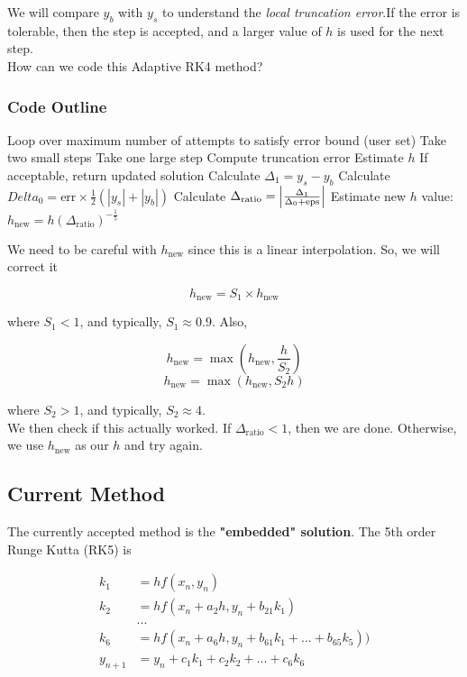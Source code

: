 \documentclass[]{article}
\begin{document}
We will compare $y_b$ with $y_s$ to understand the \textit{local truncation error}.If the error is tolerable, then the step is accepted, and a larger value of $h$ is used for the next step.\\

How can we code this Adaptive RK4 method?

\subsubsection{Code Outline}

\begin{outline}
	\1 Loop over maximum number of attempts to satisfy error bound (user set)
		\2 Take two small steps
		\2 Take one large step
		\2 Compute truncation error
		\2 Estimate $h$
		\2 If acceptable, return updated solution
	\1 Calculate $\Delta_1 = y_s - y_b$
	\1 Calculate $Delta_0 = \text{err} \times \frac{1}{2}(|y_s| + |y_b|)$
	\1 Calculate $\Delta_{\text{ratio}} = \abs{\frac{\Delta_1}{\Delta_0 + \text{eps}}}$
	\1 Estimate new $h$ value: $h_{\text{new}} = h(\Delta_{\text{ratio}})^{-\frac{1}{5}}$
\end{outline}

We need to be careful with $h_{\text{new}}$ since this is a linear interpolation. So, we will correct it

\[h_{\text{new}} = S_1 \times h_{\text{new}}\]

where $S_1<1$, and typically, $S_1 \approx 0.9$. Also,

\[h_{\text{new}} = \max(h_{\text{new}}, \frac{h}{S_2})\]
\[h_{\text{new}} = \max(h_{\text{new}}, S_2h)\]

where $S_2>1$, and typically, $S_2 \approx 4$.\\

We then check if this actually worked. If $\Delta_{\text{ratio}} < 1$, then we are done. Otherwise, we use $h_{\text{new}}$ as our $h$ and try again.\\

\subsection{Current Method}\bigbreak

The currently accepted method is the \textbf{"embedded" solution}. The 5th order Runge Kutta (RK5) is

\begin{align*}
	k_1 &= hf(x_n, y_n)\\
	k_2 &= hf(x_n+a_2h, y_n+b_{21}k_1)\\
	&...\\
	k_6 &= hf(x_n+a_6h, y_n+b_{61}k_1 + ... + b_{65}k_5))\\
	y_{n+1} &= y_n + c_1k_1 + c_2k_2 + ... + c_6k_6
\end{align*}
\end{document}
